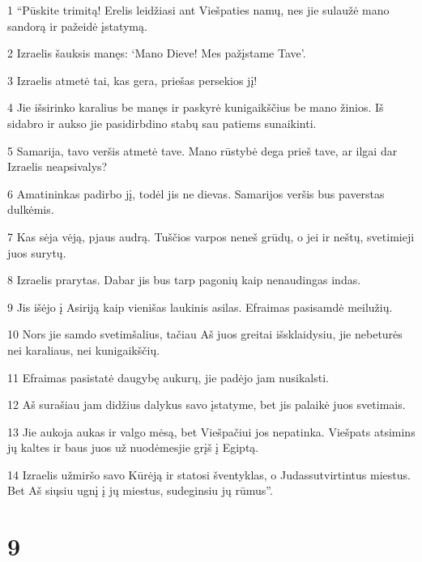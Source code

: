 \par 1 “Pūskite trimitą! Erelis leidžiasi ant Viešpaties namų, nes jie sulaužė mano sandorą ir pažeidė įstatymą. 
\par 2 Izraelis šauksis manęs: ‘Mano Dieve! Mes pažįstame Tave’. 
\par 3 Izraelis atmetė tai, kas gera, priešas persekios jį! 
\par 4 Jie išsirinko karalius be manęs ir paskyrė kunigaikščius be mano žinios. Iš sidabro ir aukso jie pasidirbdino stabų sau patiems sunaikinti. 
\par 5 Samarija, tavo veršis atmetė tave. Mano rūstybė dega prieš tave, ar ilgai dar Izraelis neapsivalys? 
\par 6 Amatininkas padirbo jį, todėl jis ne dievas. Samarijos veršis bus paverstas dulkėmis. 
\par 7 Kas sėja vėją, pjaus audrą. Tuščios varpos neneš grūdų, o jei ir neštų, svetimieji juos surytų. 
\par 8 Izraelis prarytas. Dabar jis bus tarp pagonių kaip nenaudingas indas. 
\par 9 Jis išėjo į Asiriją kaip vienišas laukinis asilas. Efraimas pasisamdė meilužių. 
\par 10 Nors jie samdo svetimšalius, tačiau Aš juos greitai išsklaidysiu, jie nebeturės nei karaliaus, nei kunigaikščių. 
\par 11 Efraimas pasistatė daugybę aukurų, jie padėjo jam nusikalsti. 
\par 12 Aš surašiau jam didžius dalykus savo įstatyme, bet jis palaikė juos svetimais. 
\par 13 Jie aukoja aukas ir valgo mėsą, bet Viešpačiui jos nepatinka. Viešpats atsimins jų kaltes ir baus juos už nuodėmes­jie grįš į Egiptą. 
\par 14 Izraelis užmiršo savo Kūrėją ir statosi šventyklas, o Judas­sutvirtintus miestus. Bet Aš siųsiu ugnį į jų miestus, sudeginsiu jų rūmus”.



\chapter{9}


